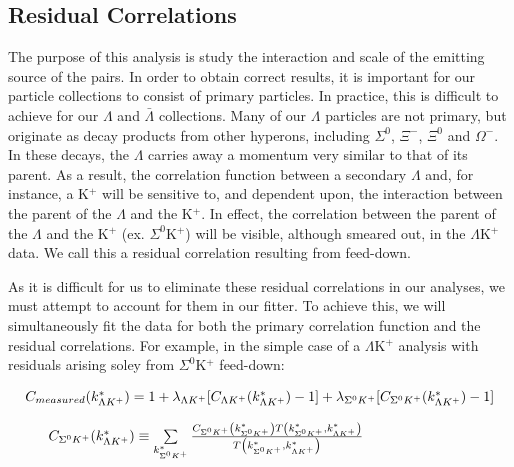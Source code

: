 \documentclass[../AnalysisNoteJBuxton.tex]{subfiles}
\begin{document}
\subsection{Residual Correlations}
\label{ResidualCorrelations}

The purpose of this analysis is study the interaction and scale of the emitting source of the pairs.
In order to obtain correct results, it is important for our particle collections to consist of primary particles.
In practice, this is difficult to achieve for our $\Lambda$ and $\bar{\Lambda}$ collections.
Many of our $\Lambda$ particles are not primary, but originate as decay products from other hyperons, including $\Sigma^{0}$, $\Xi^{-}$, $\Xi^{0}$ and $\Omega^{-}$.
In these decays, the $\Lambda$ carries away a momentum very similar to that of its parent.
As a result, the correlation function between a secondary $\Lambda$ and, for instance, a K$^{+}$  will be sensitive to, and dependent upon, the interaction between the parent of the $\Lambda$ and the K$^{+}$.
In effect, the correlation between the parent of the $\Lambda$ and the K$^{+}$ (ex. $\Sigma^{0}$K$^{+}$) will be visible, although smeared out, in the $\Lambda$K$^{+}$ data.
We call this a residual correlation resulting from feed-down.

As it is difficult for us to eliminate these residual correlations in our analyses, we must attempt to account for them in our fitter.
To achieve this, we will simultaneously fit the data for both the primary correlation function and the residual correlations.  For example, in the simple case of a $\Lambda$K$^{+}$ analysis with residuals arising soley from $\Sigma^{0}$K$^{+}$ feed-down:

\begin{equation}
\begin{array}{l}
\vspace{4mm}
 C_{measured}(k^{*}_{\Lambda K^{+}}) = 1 + \lambda_{\Lambda K^{+}}[C_{\Lambda K^{+}}(k^{*}_{\Lambda K^{+}})-1] + \lambda_{\Sigma^{0}K^{+}}[C_{\Sigma^{0}K^{+}}(k^{*}_{\Lambda K^{+}})-1] \\
\vspace{2mm}
  ~~~~~C_{\Sigma^{0}K^{+}}(k^{*}_{\Lambda K^{+}}) \equiv \sum\limits_{k^{*}_{\Sigma^{0}K^{+}}} \frac{C_{\Sigma^{0}K^{+}}\left(k^{*}_{\Sigma^{0}K^{+}}\right) T\left(k^{*}_{\Sigma^{0}K^{+}},k^{*}_{\Lambda K^{+}}\right)}{T\left(k^{*}_{\Sigma^{0}K^{+}},k^{*}_{\Lambda K^{+}}\right)}
\end{array} 
\label{eqn:SimpleResiduals}
\end{equation}
\end{document}
